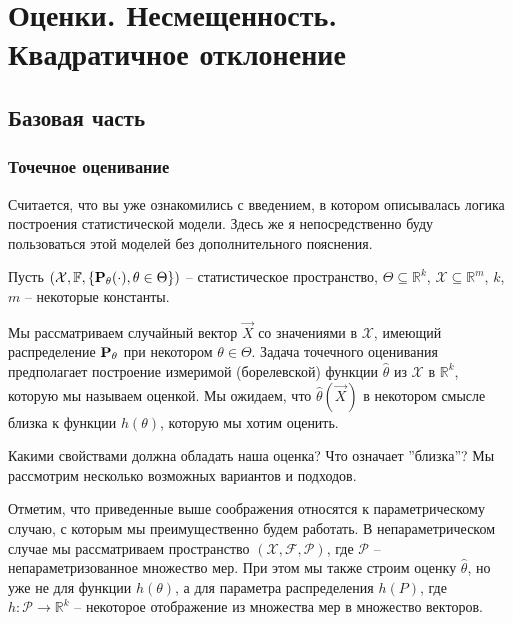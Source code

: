 \documentclass[10 pt,russian]{report}
\begin{document}
\newtheorem{Th}{Теорема}
\newtheorem{Lemm}{Лемма}
\theoremstyle{definition}
\newtheorem{Def}{Определение}
\newtheorem{Rem}{Замечание}
\newtheorem{Exam}{Пример}
\newtheorem{Que}{Вопрос}
\thispagestyle{empty}
\def\chaptername{Семинар}
\sloppy
\large
\chapter{Оценки. Несмещенность. Квадратичное отклонение}
\section{Базовая часть}
\subsection{Точечное оценивание}
Считается, что вы уже ознакомились с введением, в котором описывалась логика построения статистической модели. Здесь же я непосредственно буду пользоваться этой моделей без дополнительного пояснения.

Пусть $(\mathcal{X}, \mathbb{F}, \{{\bf P}_{\theta}(\cdot),\theta\in \Theta\})$ -- статистическое пространство, $\Theta\subseteq \mathbb{R}^k$, $\mathcal{X}\subseteq\mathbb{R}^m$, $k$, $m$ -- некоторые константы.

Мы рассматриваем случайный вектор $\vec{X}$ со значениями в $\mathcal{X}$, имеющий распределение ${\bf P}_{\theta}$ при некотором $\theta\in \Theta$. Задача точечного оценивания предполагает построение измеримой (борелевской) функции $\widehat{\theta}$ из $\mathcal{X}$ в $\mathbb{R}^k$, которую мы называем оценкой. Мы ожидаем, что $\widehat{\theta}(\vec{X})$ в некотором смысле близка к функции $h(\theta)$, которую мы хотим оценить.

Какими свойствами должна обладать наша оценка? Что означает ''близка''? Мы рассмотрим несколько возможных вариантов и подходов.

Отметим, что приведенные выше соображения относятся к параметрическому случаю, с которым мы преимущественно будем работать. В непараметрическом случае мы рассматриваем пространство $(\mathcal{X},\mathcal{F},\mathcal{P})$, где $\mathcal{P}$ -- непараметризованное множество мер. При этом мы также строим оценку $\widehat{\theta}$, но уже не для функции $h(\theta)$, а для параметра распределения $h(P)$, где $h:\mathcal{P}\to \mathbb{R}^k$ -- некоторое отображение из множества мер в множество векторов. 
\end{document}
